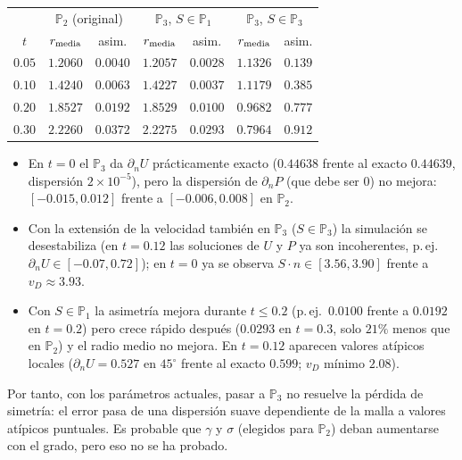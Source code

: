 \begin{center}
\begin{tabular}{c|cc|cc|cc}
\toprule
 & \multicolumn{2}{c|}{$\mathbb{P}_2$ (original)} & \multicolumn{2}{c|}{$\mathbb{P}_3$, $S\in\mathbb{P}_1$} & \multicolumn{2}{c}{$\mathbb{P}_3$, $S\in\mathbb{P}_3$}\\
$t$ & $r_{\rm media}$ & asim. & $r_{\rm media}$ & asim. & $r_{\rm media}$ & asim.\\
\midrule
$0.05$ & $1.2060$ & $0.0040$ & $1.2057$ & $0.0028$ & $1.1326$ & $0.139$\\
$0.10$ & $1.4240$ & $0.0063$ & $1.4227$ & $0.0037$ & $1.1179$ & $0.385$\\
$0.20$ & $1.8527$ & $0.0192$ & $1.8529$ & $0.0100$ & $0.9682$ & $0.777$\\
$0.30$ & $2.2260$ & $0.0372$ & $2.2275$ & $0.0293$ & $0.7964$ & $0.912$\\
\bottomrule
\end{tabular}
\end{center}

\begin{itemize}
	\item En $t=0$ el $\mathbb{P}_3$ da $\partial_nU$ prácticamente exacto ($0.44638$ frente al exacto $0.44639$, dispersión $2\times10^{-5}$), pero la dispersión de $\partial_nP$ (que debe ser $0$) no mejora: $[-0.015,0.012]$ frente a $[-0.006,0.008]$ en $\mathbb{P}_2$.
	\item Con la extensión de la velocidad también en $\mathbb{P}_3$ ($S\in\mathbb{P}_3$) la simulación se desestabiliza (en $t=0.12$ las soluciones de $U$ y $P$ ya son incoherentes, p.\,ej.\ $\partial_nU\in[-0.07,0.72]$); en $t=0$ ya se observa $S\cdot n\in[3.56,3.90]$ frente a $v_D\approx3.93$.
	\item Con $S\in\mathbb{P}_1$ la asimetría mejora durante $t\le0.2$ (p.\,ej.\ $0.0100$ frente a $0.0192$ en $t=0.2$) pero crece rápido después ($0.0293$ en $t=0.3$, solo $21\%$ menos que en $\mathbb{P}_2$) y el radio medio no mejora. En $t=0.12$ aparecen valores atípicos locales ($\partial_nU=0.527$ en $45^\circ$ frente al exacto $0.599$; $v_D$ mínimo $2.08$).
\end{itemize}
Por tanto, con los parámetros actuales, pasar a $\mathbb{P}_3$ no resuelve la pérdida de simetría: el error pasa de una dispersión suave dependiente de la malla a valores atípicos puntuales. Es probable que $\gamma$ y $\sigma$ (elegidos para $\mathbb{P}_2$) deban aumentarse con el grado, pero eso no se ha probado.

